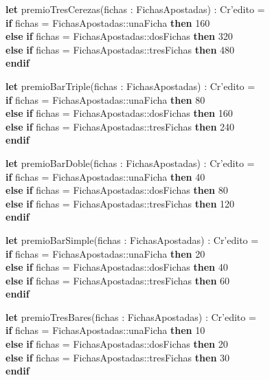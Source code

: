 \begin{itemize}
    \textbf{let} premioTresCerezas(fichas : FichasApostadas) : Cr'edito =\\
        \textbf{if} fichas = FichasApostadas::unaFicha \textbf{then} 160\\
        \textbf{else} \textbf{if} fichas = FichasApostadas::dosFichas \textbf{then} 320\\
        \textbf{else} \textbf{if} fichas = FichasApostadas::tresFichas \textbf{then} 480\\
        \textbf{endif}

    \textbf{let} premioBarTriple(fichas : FichasApostadas) : Cr'edito =\\
        \textbf{if} fichas = FichasApostadas::unaFicha \textbf{then} 80\\
        \textbf{else} \textbf{if} fichas = FichasApostadas::dosFichas \textbf{then} 160\\
        \textbf{else} \textbf{if} fichas = FichasApostadas::tresFichas \textbf{then} 240\\
        \textbf{endif}

    \textbf{let} premioBarDoble(fichas : FichasApostadas) : Cr'edito =\\
        \textbf{if} fichas = FichasApostadas::unaFicha \textbf{then} 40\\
        \textbf{else} \textbf{if} fichas = FichasApostadas::dosFichas \textbf{then} 80\\
        \textbf{else} \textbf{if} fichas = FichasApostadas::tresFichas \textbf{then} 120\\
        \textbf{endif}

    \textbf{let} premioBarSimple(fichas : FichasApostadas) : Cr'edito =\\
        \textbf{if} fichas = FichasApostadas::unaFicha \textbf{then} 20\\
        \textbf{else} \textbf{if} fichas = FichasApostadas::dosFichas \textbf{then} 40\\
        \textbf{else} \textbf{if} fichas = FichasApostadas::tresFichas \textbf{then} 60\\
        \textbf{endif}

    \textbf{let} premioTresBares(fichas : FichasApostadas) : Cr'edito =\\
        \textbf{if} fichas = FichasApostadas::unaFicha \textbf{then} 10\\
        \textbf{else} \textbf{if} fichas = FichasApostadas::dosFichas \textbf{then} 20\\
        \textbf{else} \textbf{if} fichas = FichasApostadas::tresFichas \textbf{then} 30\\
        \textbf{endif}


\end{itemize}
